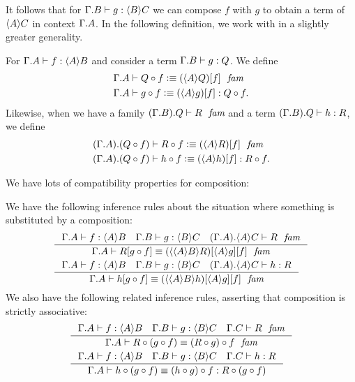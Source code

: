 It follows that for $\jterm{{\Gamma}{B}}{\ctxwk{B}{C}}{g}$ we can compose $f$
with $g$ to obtain a term of $\ctxwk{A}{C}$ in context $\ctxext{\Gamma}{A}$.
In the following definition, we work with in a slightly greater generality.

\begin{defn}
For $\jhom{\Gamma}{A}{B}{f}$ and consider a term $\jterm{{\Gamma}{B}}{Q}{g}$.
We define
\begin{align*}
\jfamdefn*{{\Gamma}{A}}{\jcomp{f}{Q}}{\subst{f}{\ctxwk{A}{Q}}}\\
\jtermdefn*{{\Gamma}{A}}{\jcomp{f}{Q}}{\jcomp{f}{g}}{\subst{f}{\ctxwk{A}{g}}}.
\end{align*}
Likewise, when we have a family $\jfam{{{\Gamma}{B}}{Q}}{R}$ and a term
$\jterm{{{\Gamma}{B}}{Q}}{R}{h}$, we define
\begin{align*}
\jfamdefn*{{{\Gamma}{A}}{\jcomp{f}{Q}}}{\jcomp{f}{R}}{\subst{f}{\ctxwk{A}{R}}}\\
\jtermdefn*{{{\Gamma}{A}}{\jcomp{f}{Q}}}{\jcomp{f}{R}}{\jcomp{f}{h}}{\subst{f}{\ctxwk{A}{h}}}.
\end{align*}
\end{defn}

We have lots of compatibility properties for composition:

\begin{lem}
We have the following inference rules about the situation where something is
substituted by a composition:
\begin{align*}
& \inference
  {\jhom{\Gamma}{A}{B}{f}
   \jhom{\Gamma}{B}{C}{g}
   \jfam{{{\Gamma}{A}}{\ctxwk{A}{C}}}{R}}
  {\jfameq
    {{\Gamma}{A}}
    {\subst{\jcomp{f}{g}}{R}}
    {\subst{f}{{\ctxwk{A}{g}}{\ctxwk{{A}{B}}{R}}}}}\\
& \inference
  {\jhom{\Gamma}{A}{B}{f}
   \jhom{\Gamma}{B}{C}{g}
   \jterm{{{\Gamma}{A}}{\ctxwk{A}{C}}}{R}{h}}
  {\jfameq
    {{\Gamma}{A}}
    {\subst{\jcomp{f}{g}}{h}}
    {\subst{f}{{\ctxwk{A}{g}}{\ctxwk{{A}{B}}{h}}}}}
\end{align*}
We also have the following related inference rules, asserting that composition
is strictly associative:
\begin{align*}
& \inference
  {\jhom{\Gamma}{A}{B}{f}
   \jhom{\Gamma}{B}{C}{g}
   \jfam{{\Gamma}{C}}{R}}
  {\jfameq
    {{\Gamma}{A}}
    {\jcomp{{f}{g}}{R}}
    {\jcomp{f}{{g}{R}}}}\\
& \inference
  {\jhom{\Gamma}{A}{B}{f}
   \jhom{\Gamma}{B}{C}{g}
   \jterm{{\Gamma}{C}}{R}{h}}
  {\jtermeq
    {{\Gamma}{A}}
    {\jcomp{{f}{g}}{R}}
    {\jcomp{{f}{g}}{h}}
    {\jcomp{f}{{g}{h}}}}
\end{align*}
\end{lem}

